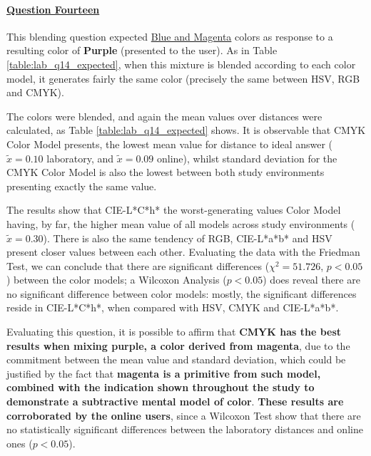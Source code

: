 \paragraph{\ul{Question Fourteen}}
%
This blending question expected \ul{Blue and Magenta} colors as response to a resulting color of \textbf{Purple} (presented to the user). As in Table \ref{table:lab_q14_expected},
when this mixture is blended according to each color model, it generates fairly the same color (precisely the same between HSV, RGB and CMYK). \par
%
The colors were blended, and again the mean values over distances were calculated, as Table \ref{table:lab_q14_expected} shows. It is observable that CMYK Color Model presents,
the lowest mean value for distance to ideal answer ($\tilde{x} = 0.10$ laboratory, and $\tilde{x} = 0.09$ online), whilst standard deviation for the CMYK Color Model is also the
lowest between both study environments presenting exactly the same value. \par
%
The results show that CIE-L*C*h* the worst-generating values Color Model having, by far, the higher mean value of all models across study environments ($\tilde{x} = 0.30$). There is also the same tendency of RGB,
CIE-L*a*b* and HSV present closer values between each other. Evaluating the data with the Friedman Test, we can conclude that there are significant differences ($\chi^2 = 51.726$, $p < 0.05$)
between the color models; a Wilcoxon Analysis ($p < 0.05$) does reveal there are no significant difference between color models: mostly, the significant differences reside in CIE-L*C*h*, when
compared with HSV, CMYK and CIE-L*a*b*. \par
%
Evaluating this question, it is possible to affirm that \textbf{CMYK has the best results when mixing purple, a color derived from magenta}, due to the commitment between the mean value and standard deviation, which
could be justified by the fact that \textbf{magenta is a primitive from such model, combined with the indication shown throughout the study to demonstrate a subtractive mental model of color}.
\textbf{These results are corroborated by the online users}, since a Wilcoxon Test show that there are no statistically significant differences between the laboratory distances and online ones ($p < 0.05$).
%
